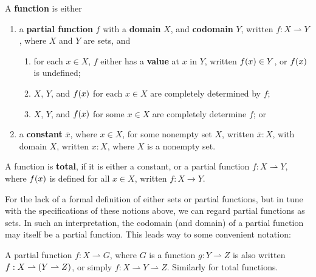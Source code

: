 \begin{specification} A \textbf{function} is either

\begin{enumerate}

\item a \textbf{partial function} $f$ with a \textbf{domain} $X$, and
\textbf{codomain} $Y$, written $f:X\rightharpoonup Y$, where $X$ and $Y$ are
sets, and

\begin{enumerate}

\item for each $x\in X$, $f$ either has a \textbf{value} at $x$ in $Y$, written
$f\mathopen{}\left({x}\right)\mathclose{}\in Y$, or $f\mathopen{}\left({x}\right)\mathclose{}$ is undefined;

\item $X$, $Y$, and $f\mathopen{}\left({x}\right)\mathclose{}$ for each $x\in X$ are completely determined by $f$;

\item $X$, $Y$, and $f\mathopen{}\left({x}\right)\mathclose{}$ for some $x\in X$ are completely determine $f$; or

\end{enumerate}

\item a \textbf{constant} $\overline{x}$, where $x\in X$, for some nonempty set
$X$, written $\overline{x}:X$, with domain $X$, written $x:X$, where $X$ is a
nonempty set.

\end{enumerate}

\end{specification}

\begin{definition} A function is \textbf{total}, if it is either a constant, or
a partial function $f:X\rightharpoonup Y$, where $f\mathopen{}\left({x}\right)\mathclose{}$ is defined for all
$x\in X$, written $f:X\rightarrow Y$.\end{definition}

For the lack of a formal definition of either sets or partial functions, but in
tune with the specifications of these notions above, we can regard partial
functions as sets. In such an interpretation, the codomain (and domain) of a
partial function may itself be a partial function. This leads way to some
convenient notation:

\begin{notation} A partial function $f:X\rightharpoonup G$, where $G$ is a
function $g:Y\rightharpoonup Z$ is also written $f:X\rightharpoonup
\mathopen{}\left({Y\rightharpoonup Z}\right)\mathclose{}$, or simply $f:X\rightharpoonup Y\rightharpoonup Z$.
Similarly for total functions.  \end{notation}

